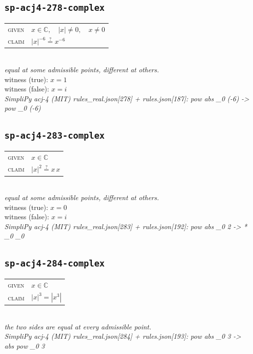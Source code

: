 \documentclass[11pt]{article}
\begin{document}
\subsection*{\texttt{sp-acj4-278-complex}}
\begin{tabular}{@{}l@{\quad}l@{}}
\textsc{given} & $x \in \mathbb{C},\quad \left|x\right| \neq 0,\quad x \neq 0$ \\[4pt]
\textsc{claim} & $\displaystyle \left|x\right|^{-6} \overset{?}{=} x^{-6}$ \\
\end{tabular}\\[2pt]
{\small\emph{equal at some admissible points, different at others.}}\\
{\footnotesize\color{gray}witness (true): $x = 1$}\\
{\footnotesize\color{gray}witness (false): $x = i$}\\
\emph{SimpliPy acj-4 (MIT) rules\_real.json[278] + rules.json[187]: pow abs \_0 (-6)  ->  pow \_0 (-6)}\\

\subsection*{\texttt{sp-acj4-283-complex}}
\begin{tabular}{@{}l@{\quad}l@{}}
\textsc{given} & $x \in \mathbb{C}$ \\[4pt]
\textsc{claim} & $\displaystyle \left|x\right|^{2} \overset{?}{=} x \, x$ \\
\end{tabular}\\[2pt]
{\small\emph{equal at some admissible points, different at others.}}\\
{\footnotesize\color{gray}witness (true): $x = 0$}\\
{\footnotesize\color{gray}witness (false): $x = i$}\\
\emph{SimpliPy acj-4 (MIT) rules\_real.json[283] + rules.json[192]: pow abs \_0 2  ->  * \_0 \_0}\\

\subsection*{\texttt{sp-acj4-284-complex}}
\begin{tabular}{@{}l@{\quad}l@{}}
\textsc{given} & $x \in \mathbb{C}$ \\[4pt]
\textsc{claim} & $\displaystyle \left|x\right|^{3} = \left|x^{3}\right|$ \\
\end{tabular}\\[2pt]
{\small\emph{the two sides are equal at every admissible point.}}\\
\emph{SimpliPy acj-4 (MIT) rules\_real.json[284] + rules.json[193]: pow abs \_0 3  ->  abs pow \_0 3}\\
\end{document}
